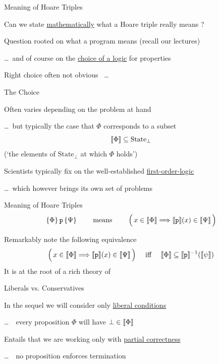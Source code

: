 \documentclass{beamer}
\begin{document}
\begin{frame}{Meaning of Hoare Triples}

        Can we state \alert{\underline{mathematically}} what a Hoare triple really means ?

        \pause
        \bigskip
        Question rooted on what a program means {\small (recall our lectures)}

        \dots \, and of course on the \alert{\underline{choice of a logic}} for properties

        \pause
        \bigskip
        Right choice often not obvious \, \dots
\end{frame}

\begin{frame}{The Choice}
        
        Often varies depending on the problem at hand

        \dots \, but typically the case that $\Phi$ corresponds to a subset
        \[
                \llbracket \Phi \rrbracket \subseteq \mathrm{State}_\bot
        \]
        {\small (`the elements of $\mathrm{State}_\bot$ at which $\Phi$ holds')}

        \pause
        \bigskip
        Scientists typically fix on the well-established \alert{\underline{first-order-logic}}

        \dots \, which however brings its own set of problems

\end{frame}

\begin{frame}{Meaning of Hoare Triples}
        \[
                \{ \Phi \} \, \mathtt{p} \, \{ \Psi \} \qquad \text{ means } \qquad 
                \Big ( \, x \in \llbracket \Phi \rrbracket \Longrightarrow \llbracket \mathtt{p} \rrbracket(x) \in \llbracket \Psi \rrbracket \, \Big )
        \]

        \pause
        \bigskip
        \bigskip
        Remarkably note the following equivalence
        \[
                \Big ( \, x \in \llbracket \Phi \rrbracket \Longrightarrow \llbracket \mathtt{p} \rrbracket(x) \in \llbracket \Psi \rrbracket \, \Big )
                \quad
                \text{ iff }
                \quad 
                \llbracket \Phi \rrbracket \subseteq \llbracket \mathtt{p} \rrbracket^{-1}(\llbracket \psi \rrbracket)
        \]
        It is at the root of a rich theory of
        \begin{center}
        \end{center}
\end{frame}

\begin{frame}{Liberals vs. Conservatives}

        In the sequel we will consider only \alert{\underline{liberal conditions}}

        \dots \, \ie\ every proposition $\Phi$ will have $\bot \in \llbracket \Phi \rrbracket$

        \bigskip
        Entails that we are working only with \alert{\underline{partial correctness}}

        \dots \, \ie\ no proposition enforces termination
\end{frame}



\end{document}
